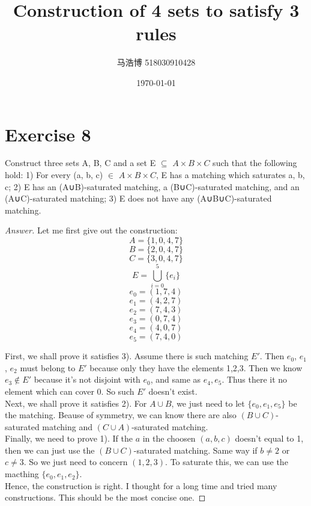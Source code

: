 \documentclass[12pt]{article}
\title{Construction of 4 sets to satisfy 3 rules}
\author{马浩博 518030910428}
\date{\today}
\theoremstyle{mythm}
\begin{document}
\maketitle

\section*{Exercise 8}
\begin{tcolorbox}
  Construct three sets A, B, C and a set E $\subseteq$ $A \times B \times C$ 
  such that the following hold: 1) For every (a, b, c) $\in$ $A \times B \times C$, E has a matching which saturates {a, b, c}; 
  2) E has an (A∪B)-saturated matching, a (B∪C)-saturated matching, and an (A∪C)-saturated matching; 3) E does not have any (A∪B∪C)-saturated matching.

\end{tcolorbox}

\begin{proof}[Answer]

  Let me first give out the construction:
  $$A = \{1, 0, 4, 7 \}$$
  $$B = \{2, 0, 4, 7 \}$$
  $$C = \{3, 0, 4, 7 \}$$
  $$E = \bigcup\limits_{i=0}^5 \{e_i\}$$
  $$e_0 = (1,7,4)$$
  $$e_1 = (4,2,7)$$
  $$e_2 = (7,4,3)$$
  $$e_3 = (0,7,4)$$
  $$e_4 = (4,0,7)$$
  $$e_5 = (7,4,0)$$



  First, we shall prove it satisfies 3). Assume there is such matching $E'$. 
  Then $e_0$, $e_1$, $e_2$ must belong to $E'$ because only they have the elements 1,2,3. 
  Then we know $e_3 \notin E'$ because it's not disjoint with $e_0$, and same as $e_4, e_5$. 
  Thus there it no element which can cover 0. So such $E'$ doesn't exist.\\

  Next, we shall prove it satisfies 2). For $A \cup B$, we just need to let $\{e_0,e_1,e_5\}$ be the matching. 
  Beause of symmetry, we can know there are also $(B \cup C)$-saturated matching and $(C \cup A)$-saturated matching.\\

  Finally, we need to prove 1). If the $a$ in the choosen $(a,b,c)$ doesn't equal to 1, then we can just use the $(B \cup C)$-saturated matching.
  Same way if $b \neq 2$ or $c \neq 3$. So we just need to concern $(1,2,3)$. 
  To saturate this, we can use the macthing $\{e_0,e_1,e_2\}$.\\

  Hence, the construction is right. I thought for a long time and tried many constructions. 
  This should be the most concise one.

\end{proof}
\end{document}
